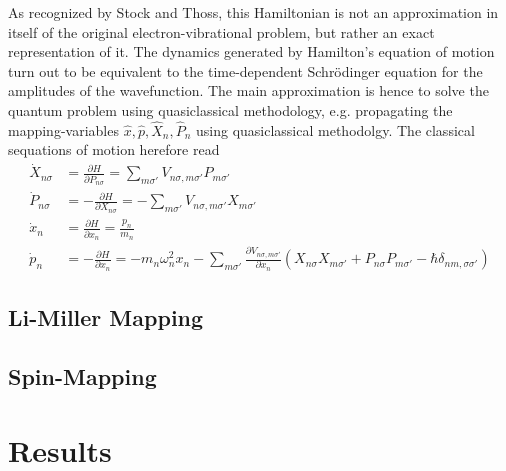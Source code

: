 \documentclass{article}
\begin{document}
As recognized by Stock and Thoss, this Hamiltonian is not an approximation in itself of the original electron-vibrational problem, but rather an exact representation of it. The dynamics generated by Hamilton's equation of motion turn out to be equivalent to the time-dependent Schrödinger equation for the amplitudes of the wavefunction. 
The main approximation is hence to solve the quantum problem using quasiclassical methodology, e.g. propagating the mapping-variables $\hat{x},\hat{p},\hat{X}_n,\hat{P}_n$ using quasiclassical methodolgy. 
The classical sequations of motion herefore read
\begin{align}
	\dot{X}_{n\sigma}& = \frac{\partial H}{\partial P_{n\sigma}}= \sum_{m\sigma'} V_{n\sigma,m\sigma'}P_{m\sigma'}\\
	\dot{P}_{n\sigma}& = -\frac{\partial H}{\partial X_{n\sigma}}= -\sum_{m\sigma'} V_{n\sigma,m\sigma'}X_{m\sigma'}\\
	\dot{x}_n &= \frac{\partial H}{\partial x_n}= \frac{p_n}{m_n}\\
	\dot{p}_n &= -\frac{\partial H}{\partial x_n}= -m_n\omega_n^2 x_n - \sum_{m\sigma'}\frac{\partial V_{n\sigma,m\sigma'}}{\partial x_n }(X_{n\sigma}X_{m\sigma'}+P_{n\sigma}P_{m\sigma'}-\hbar\delta_{nm,\sigma\sigma'})
\end{align}
\subsection{Li-Miller Mapping}
\subsection{Spin-Mapping}
\section{Results}
\end{document}
